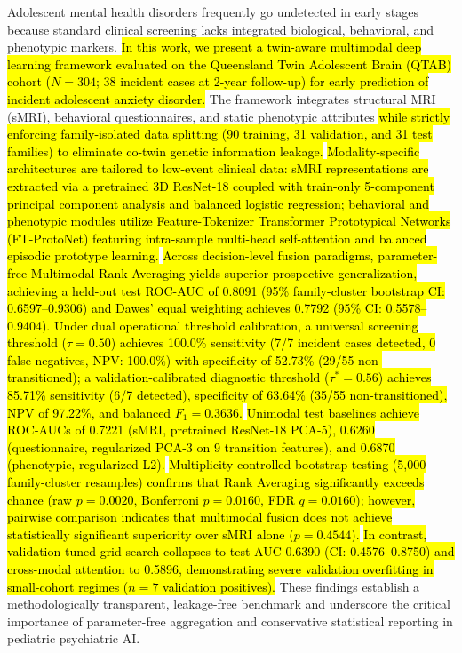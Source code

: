 \documentclass[10pt,letterpaper]{article}
\begin{document}
Adolescent mental health disorders frequently go undetected in early stages because standard clinical screening lacks integrated biological, behavioral, and phenotypic markers. \hl{In this work, we present a twin-aware multimodal deep learning framework evaluated on the Queensland Twin Adolescent Brain (QTAB) cohort ($N=304$; 38 incident cases at 2-year follow-up) for early prediction of incident adolescent anxiety disorder.} The framework integrates structural MRI (sMRI), behavioral questionnaires, and static phenotypic attributes \hl{while strictly enforcing family-isolated data splitting (90 training, 31 validation, and 31 test families) to eliminate co-twin genetic information leakage.} \hl{Modality-specific architectures are tailored to low-event clinical data: sMRI representations are extracted via a pretrained 3D ResNet-18 coupled with train-only 5-component principal component analysis and balanced logistic regression; behavioral and phenotypic modules utilize Feature-Tokenizer Transformer Prototypical Networks (FT-ProtoNet) featuring intra-sample multi-head self-attention and balanced episodic prototype learning.} \hl{Across decision-level fusion paradigms, parameter-free Multimodal Rank Averaging yields superior prospective generalization, achieving a held-out test ROC-AUC of 0.8091 (95\% family-cluster bootstrap CI: 0.6597--0.9306) and Dawes' equal weighting achieves 0.7792 (95\% CI: 0.5578--0.9404). Under dual operational threshold calibration, a universal screening threshold ($\tau = 0.50$) achieves 100.0\% sensitivity (7/7 incident cases detected, 0 false negatives, NPV: 100.0\%) with specificity of 52.73\% (29/55 non-transitioned); a validation-calibrated diagnostic threshold ($\tau^* = 0.56$) achieves 85.71\% sensitivity (6/7 detected), specificity of 63.64\% (35/55 non-transitioned), NPV of 97.22\%, and balanced $F_1 = 0.3636$.} \hl{Unimodal test baselines achieve ROC-AUCs of 0.7221 (sMRI, pretrained ResNet-18 PCA-5), 0.6260 (questionnaire, regularized PCA-3 on 9 transition features), and 0.6870 (phenotypic, regularized L2).} \hl{Multiplicity-controlled bootstrap testing (5,000 family-cluster resamples) confirms that Rank Averaging significantly exceeds chance (raw $p = 0.0020$, Bonferroni $p = 0.0160$, FDR $q = 0.0160$); however, pairwise comparison indicates that multimodal fusion does not achieve statistically significant superiority over sMRI alone ($p = 0.4544$).} \hl{In contrast, validation-tuned grid search collapses to test AUC 0.6390 (CI: 0.4576--0.8750) and cross-modal attention to 0.5896, demonstrating severe validation overfitting in small-cohort regimes ($n=7$ validation positives).} These findings establish a methodologically transparent, leakage-free benchmark and underscore the critical importance of parameter-free aggregation and conservative statistical reporting in pediatric psychiatric AI.
\end{document}
